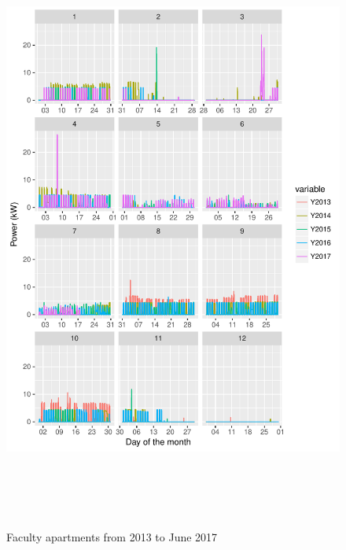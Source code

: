 \documentclass[11pt, oneside]{article}   	%
\begin{document}
\begin{figure}
\includegraphics[width=30cm,height=20cm,keepaspectratio]{fac_build.pdf}
\caption{Faculty apartments from  2013 to June 2017}
\end{figure}
\end{document}
